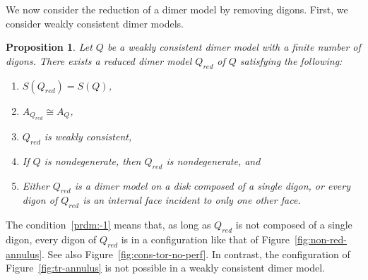 \documentclass{article}
\newtheorem{prop}[thm]{Proposition}
\theoremstyle{definition}
\begin{document}
We now consider the reduction of a dimer model by removing digons.
First, we consider weakly consistent dimer models.
\begin{prop}\label{prop:reduce-dimer-model}
	Let $Q$ be a weakly consistent dimer model with a finite number of digons. There exists a \textit{reduced dimer model $Q_{red}$ of $Q$} satisfying the following:
	\begin{enumerate}
		\item\label{prdm:0} $S(Q_{red})=S(Q)$,
		\item\label{prdm:1} $A_{Q_{red}}\cong A_Q$,
		\item\label{prdm:2}$Q_{red}$ is weakly consistent,
		\item\label{prdm:55}If $Q$ is nondegenerate, then $Q_{red}$ is nondegenerate, and
		\item\label{prdm:-1} Either $Q_{red}$ is a dimer model on a disk composed of a single digon, or every digon of $Q_{red}$ is an internal face incident to only one other face. 
	\end{enumerate}

\end{prop}
The condition~\eqref{prdm:-1} means that, as long as $Q_{red}$ is not composed of a single digon, every digon of $Q_{red}$ is in a configuration like that of Figure~\ref{fig:non-red-annulus}. See also Figure~\ref{fig:cons-tor-no-perf}. In contrast, the configuration of Figure~\ref{fig:tr-annulus} is not possible in a weakly consistent dimer model.
\end{document}
